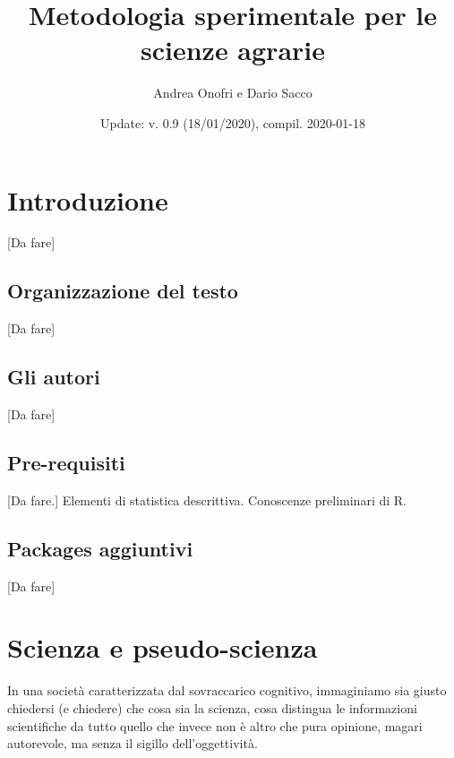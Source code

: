 \documentclass[a4paper,12pt,oneside]{book}
\author{Andrea Onofri e Dario Sacco}
\date{Update: v. 0.9 (18/01/2020), compil. 2020-01-18}
\title{Metodologia sperimentale per le scienze agrarie}
\subtitle{}
\begin{document}
\maketitle
\tableofcontents

\hypertarget{introduzione}{%
\chapter*{Introduzione}\label{introduzione}}

{[}Da fare{]}

\hypertarget{organizzazione-del-testo}{%
\section*{Organizzazione del testo}\label{organizzazione-del-testo}}

{[}Da fare{]}

\hypertarget{gli-autori}{%
\section*{Gli autori}\label{gli-autori}}

{[}Da fare{]}

\hypertarget{pre-requisiti}{%
\section*{Pre-requisiti}\label{pre-requisiti}}

{[}Da fare.{]} Elementi di statistica descrittiva. Conoscenze preliminari di R.

\hypertarget{packages-aggiuntivi}{%
\section*{Packages aggiuntivi}\label{packages-aggiuntivi}}

{[}Da fare{]}

\hypertarget{scienza-e-pseudo-scienza}{%
\chapter{Scienza e pseudo-scienza}\label{scienza-e-pseudo-scienza}}

In una società caratterizzata dal sovraccarico cognitivo, immaginiamo sia giusto chiedersi (e chiedere) che cosa sia la scienza, cosa distingua le informazioni scientifiche da tutto quello che invece non è altro che pura opinione, magari autorevole, ma senza il sigillo dell'oggettività.
\end{document}
